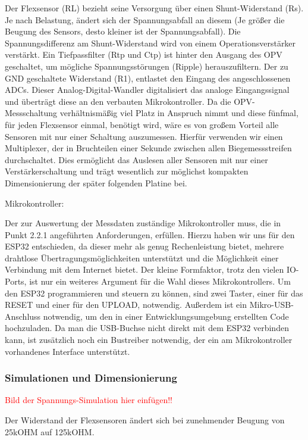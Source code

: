\documentclass[11pt]{article}
\begin{document}
Der Flexsensor (RL) bezieht seine Versorgung über einen Shunt-Widerstand (Rs). Je nach Belastung, ändert sich der 
Spannungsabfall an diesem (Je größer die Beugung des Sensors, desto kleiner ist der Spannungsabfall). Die Spannungsdifferenz 
am Shunt-Widerstand wird von einem Operationsverstärker verstärkt. Ein Tiefpassfilter (Rtp und Ctp) ist hinter den Ausgang des 
OPV geschaltet, um mögliche Spannungsstörungen (Ripple) herauszufiltern. Der zu GND geschaltete Widerstand (R1), entlastet 
den Eingang des angeschlossenen ADCs. Dieser Analog-Digital-Wandler digitalisiert das analoge Eingangssignal und überträgt 
diese an den verbauten Mikrokontroller. Da die OPV-Messschaltung verhältnismäßig viel Platz in Anspruch nimmt und diese 
fünfmal, für jeden Flexsensor einmal, benötigt wird, wäre es von großem Vorteil alle Sensoren mit nur einer Schaltung 
auszumessen. Hierfür verwenden wir einen Multiplexer, der in Bruchteilen einer Sekunde zwischen allen Biegemessstreifen 
durchschaltet. Dies ermöglicht das Auslesen aller Sensoren mit nur einer Verstärkerschaltung und trägt wesentlich zur 
möglichst kompakten Dimensionierung der später folgenden Platine bei. 

Mikrokontroller:

Der zur Auswertung der Messdaten zuständige Mikrokontroller muss, die in Punkt 2.2.1 angeführten Anforderungen, erfüllen. 
Hierzu haben wir uns für den ESP32 entschieden, da dieser mehr als genug Rechenleistung bietet, mehrere drahtlose 
Übertragungsmöglichkeiten unterstützt und die Möglichkeit einer Verbindung mit dem Internet bietet. Der kleine Formfaktor, 
trotz den vielen IO-Ports, ist nur ein weiteres Argument für die Wahl dieses Mikrokontrollers. Um den ESP32 programmieren 
und steuern zu können, sind zwei Taster, einer für das RESET und einer für den UPLOAD, notwendig. Außerdem ist ein 
Mikro-USB-Anschluss notwendig, um den in einer Entwicklungsumgebung erstellten Code hochzuladen. Da man die USB-Buchse 
nicht direkt mit dem ESP32 verbinden kann, ist zusätzlich noch ein Bustreiber notwendig, der ein am Mikrokontroller 
vorhandenes Interface unterstützt.  

\subsubsection{Simulationen und Dimensionierung}
\textcolor{red}{Bild der Spannungs-Simulation hier einfügen!!}

Der Widerstand der Flexsensoren ändert sich bei zunehmender Beugung von 25kOHM auf 125kOHM.
\end{document}
